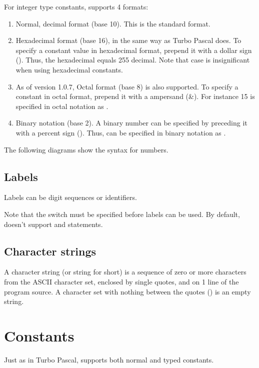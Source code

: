 For integer type constants, \fpc supports 4 formats:
\begin{enumerate}
\item Normal, decimal format (base 10). This is the standard format.
\item Hexadecimal format (base 16), in the same way as Turbo Pascal does.
To specify a constant value in hexadecimal format, prepend it with a dollar
sign (\var{\$}). Thus, the hexadecimal  equals 255 decimal.
Note that case is insignificant when using hexadecimal constants.
\item As of version 1.0.7, Octal format (base 8) is also supported.
To specify a constant in octal format, prepend it with a ampersand (\&).
For instance 15 is specified in octal notation as .
\item Binary notation (base 2). A binary number can be specified
by preceding it with a percent sign (\var{\%}). Thus,  can be
specified in binary notation as .
\end{enumerate}
The following diagrams show the syntax for numbers.


\section{Labels}
Labels can be digit sequences or identifiers.

\begin{remark}
Note that the  switch must be specified before labels can be used.
By default, \fpc doesn't support  and  statements.
\end{remark}

\section{Character strings}
A character string (or string for short) is a sequence of zero or more
characters from the ASCII character set, enclosed by single quotes, and on 1
line of the program source.
A character set with nothing between the quotes () is an empty
string.

\chapter{Constants}
Just as in Turbo Pascal, \fpc supports both normal and typed constants.

